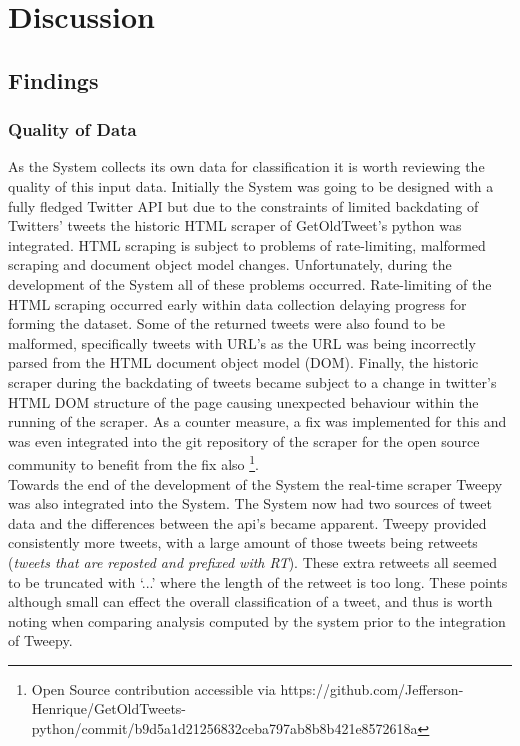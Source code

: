 \documentclass[11pt]{report}
\begin{document}
\chapter{Discussion}

\section{Findings}

\subsection*{Quality of Data}
As the System collects its own data for classification it is worth reviewing the quality of this input data. Initially the System was going to be designed with a fully fledged Twitter API but due to the constraints of limited backdating of Twitters' tweets the historic HTML scraper of GetOldTweet's python was integrated. HTML scraping is subject to problems of rate-limiting, malformed scraping and document object model changes. Unfortunately, during the development of the System all of these problems occurred. Rate-limiting of the HTML scraping occurred early within data collection delaying progress for forming the dataset. Some of the returned tweets were also found to be malformed, specifically tweets with URL's as the URL was being incorrectly parsed from the HTML document object model (DOM). Finally, the historic scraper during the backdating of tweets became subject to a change in twitter's HTML DOM structure of the page causing unexpected behaviour within the running of the scraper. As a counter measure, a fix was implemented for this and was even integrated into the git repository of the scraper for the open source community to benefit from the fix also \footnote{Open Source contribution accessible via https://github.com/Jefferson-Henrique/GetOldTweets-python/commit/b9d5a1d21256832ceba797ab8b8b421e8572618a}.
\\

Towards the end of the development of the System the real-time scraper Tweepy was also integrated into the System. The System now had two sources of tweet data and the differences between the api's became apparent. Tweepy provided consistently more tweets, with a large amount of those tweets being retweets (\textit{tweets that are reposted and prefixed with RT}). These extra retweets all seemed to be truncated with `...' where the length of the retweet is too long. These points although small can effect the overall classification of a tweet, and thus is worth noting when comparing analysis computed by the system prior to the integration of Tweepy.
\\
\end{document}
